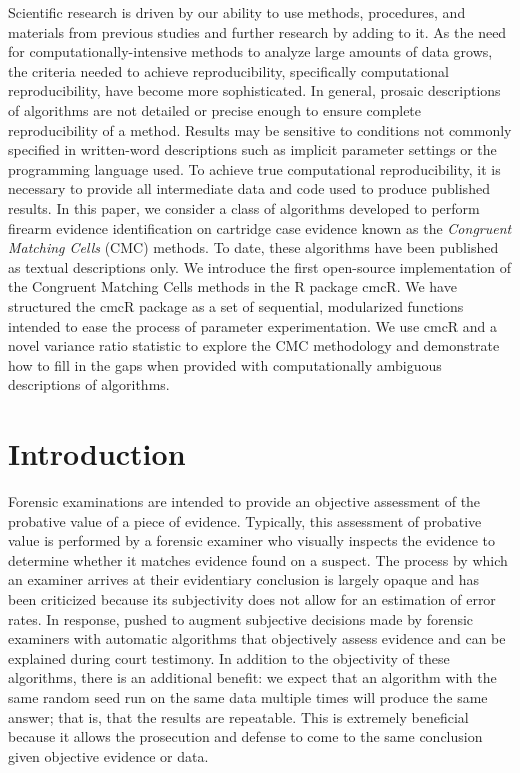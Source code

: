 \documentclass[11pt,]{isuthesis}
\begin{document}
Scientific research is driven by our ability to use methods, procedures, and materials from previous studies and further research by adding to it.
As the need for computationally-intensive methods to analyze large amounts of data grows, the criteria needed to achieve reproducibility, specifically computational reproducibility, have become more sophisticated.
In general, prosaic descriptions of algorithms are not detailed or precise enough to ensure complete reproducibility of a method.
Results may be sensitive to conditions not commonly specified in written-word descriptions such as implicit parameter settings or the programming language used.
To achieve true computational reproducibility, it is necessary to provide all intermediate data and code used to produce published results.
In this paper, we consider a class of algorithms developed to perform firearm evidence identification on cartridge case evidence known as the \emph{Congruent Matching Cells} (CMC) methods.
To date, these algorithms have been published as textual descriptions only.
We introduce the first open-source implementation of the Congruent Matching Cells methods in the R package cmcR.
We have structured the cmcR package as a set of sequential, modularized functions intended to ease the process of parameter experimentation.
We use cmcR and a novel variance ratio statistic to explore the CMC methodology and demonstrate how to fill in the gaps when provided with computationally ambiguous descriptions of algorithms.

\hypertarget{intro}{%
\section{Introduction}\label{intro}}

Forensic examinations are intended to provide an objective assessment of the probative value of a piece of evidence.
Typically, this assessment of probative value is performed by a forensic examiner who visually inspects the evidence to determine whether it matches evidence found on a suspect.
The process by which an examiner arrives at their evidentiary conclusion is largely opaque and has been criticized \citep{pcast2016} because its subjectivity does not allow for an estimation of error rates.
In response, \citet{council_strengthening_2009} pushed to augment subjective decisions made by forensic examiners with automatic algorithms that objectively assess evidence and can be explained during court testimony.
In addition to the objectivity of these algorithms, there is an additional benefit: we expect that an algorithm with the same random seed run on the same data multiple times will produce the same answer; that is, that the results are repeatable.
This is extremely beneficial because it allows the prosecution and defense to come to the same conclusion given objective evidence or data.
\end{document}
